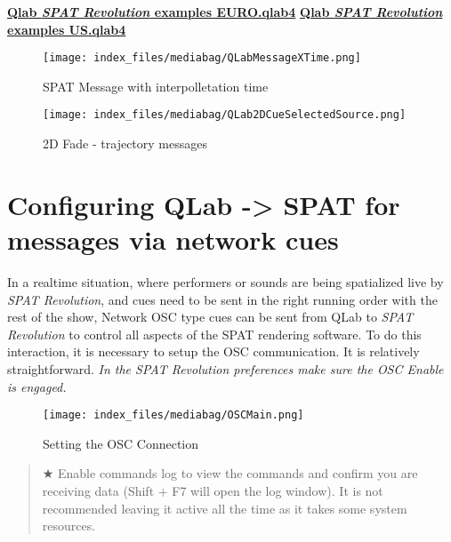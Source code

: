 \documentclass[
  letterpaper,
  DIV=11,
  numbers=noendperiod]{scrreport}
\begin{document}
\textbf{\href{https://public.3.basecamp.com/p/nB4YRiTASZ9DrT8nLH11XzqY}{Qlab
\emph{SPAT Revolution} examples EURO.qlab4}}
\textbf{\href{https://public.3.basecamp.com/p/N9foEbx4DhktH5K53yAhugdM}{Qlab
\emph{SPAT Revolution} examples US.qlab4}}

\begin{figure}

{\centering \texttt{[image: index\_files/mediabag/QLabMessageXTime.png]}

}

\caption{SPAT Message with interpolletation time}

\end{figure}

\begin{figure}

{\centering \texttt{[image: index\_files/mediabag/QLab2DCueSelectedSource.png]}

}

\caption{2D Fade - trajectory messages}

\end{figure}

\hypertarget{configuring-qlab---spat-for-messages-via-network-cues}{%
\section{Configuring QLab -\textgreater{} SPAT for messages via network
cues}\label{configuring-qlab---spat-for-messages-via-network-cues}}

In a realtime situation, where performers or sounds are being
spatialized live by \emph{SPAT Revolution}, and cues need to be sent in
the right running order with the rest of the show, Network OSC type cues
can be sent from QLab to \emph{SPAT Revolution} to control all aspects
of the SPAT rendering software. To do this interaction, it is necessary
to setup the OSC communication. It is relatively straightforward.
\emph{In the \emph{SPAT Revolution} preferences make sure the OSC Enable
is engaged.}

\begin{figure}

{\centering \texttt{[image: index\_files/mediabag/OSCMain.png]}

}

\caption{Setting the OSC Connection}

\end{figure}

\begin{quote}
★ Enable commands log to view the commands and confirm you are receiving
data (Shift + F7 will open the log window). It is not recommended
leaving it active all the time as it takes some system resources.
\end{quote}
\end{document}
